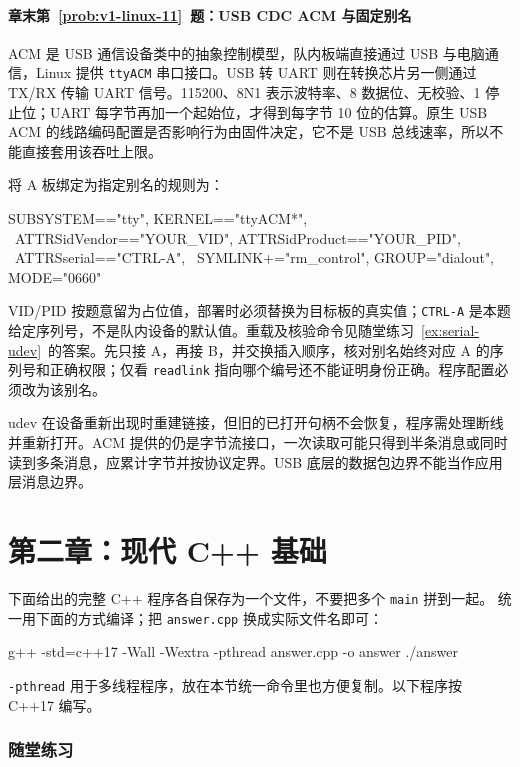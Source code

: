 \paragraph*{章末第~\ref{prob:v1-linux-11}~题：USB CDC ACM 与固定别名}
\begin{solution}
ACM 是 USB 通信设备类中的抽象控制模型，队内板端直接通过 USB 与电脑通信，Linux 提供 \texttt{ttyACM} 串口接口。USB 转 UART 则在转换芯片另一侧通过 TX/RX 传输 UART 信号。115200、8N1 表示波特率、8 数据位、无校验、1 停止位；UART 每字节再加一个起始位，才得到每字节 10 位的估算。原生 USB ACM 的线路编码配置是否影响行为由固件决定，它不是 USB 总线速率，所以不能直接套用该吞吐上限。

将 A 板绑定为指定别名的规则为：

\begin{tbash}
SUBSYSTEM=="tty", KERNEL=="ttyACM*", \
  ATTRS{idVendor}=="YOUR_VID", ATTRS{idProduct}=="YOUR_PID", \
  ATTRS{serial}=="CTRL-A", \
  SYMLINK+="rm_control", GROUP="dialout", MODE="0660"
\end{tbash}

VID/PID 按题意留为占位值，部署时必须替换为目标板的真实值；\texttt{CTRL-A} 是本题给定序列号，不是队内设备的默认值。重载及核验命令见随堂练习~\ref{ex:serial-udev}~的答案。先只接 A，再接 B，并交换插入顺序，核对别名始终对应 A 的序列号和正确权限；仅看 \texttt{readlink} 指向哪个编号还不能证明身份正确。程序配置必须改为该别名。

udev 在设备重新出现时重建链接，但旧的已打开句柄不会恢复，程序需处理断线并重新打开。ACM 提供的仍是字节流接口，一次读取可能只得到半条消息或同时读到多条消息，应累计字节并按协议定界。USB 底层的数据包边界不能当作应用层消息边界。
\end{solution}

\section*{第二章：现代 C++ 基础}
{}
下面给出的完整 C++ 程序各自保存为一个文件，不要把多个 \texttt{main} 拼到一起。
统一用下面的方式编译；把 \texttt{answer.cpp} 换成实际文件名即可：
\begin{tbash}
g++ -std=c++17 -Wall -Wextra -pthread answer.cpp -o answer
./answer
\end{tbash}
\texttt{-pthread} 用于多线程程序，放在本节统一命令里也方便复制。以下程序按 C++17 编写。

\subsubsection*{随堂练习}

